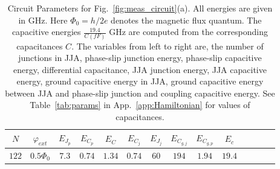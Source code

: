 \documentclass[prx,showpacs,notitlepage,twocolumn,superscriptaddress,nofootinbib,preprintnumbers,floatfix]{revtex4-2}
\begin{document}
\begin{table}[htb]
\centering
\begin{tabular}{|c|c|c|c|c|c|c|c|c|c|c|c|c|c|}
    \hline
     $N$&$\varphi_{ext}$ & $E_{J_p}$ & $E_{C_p}$&$E_C$&$E_{C_j}$& $E_{J_j}$& $E_{C_{g,j}}$&$E_{C_{g,p}}$&$E_c$\\
     \hline
$122$&$0.5\Phi_0$& $7.3$ & $0.74$ &$1.34$&$0.74$ & $60$ & $194$ &$1.94$ &$19.4$\\   \hline
\end{tabular}
\caption{Circuit Parameters for Fig.~\ref{fig:meas_circuit}(a). All energies are given in GHz. Here $\Phi_0=h/2e$ denotes the magnetic flux quantum. The capacitive energies $\frac{19.4}{C(fF)}$ GHz are computed from the corresponding capacitances $C$. The variables from left to right are, the number of junctions in JJA, phase-slip junction energy, phase-slip capacitive energy, differential capacitance, JJA junction energy, JJA capacitive energy, ground capacitive energy in JJA, ground capacitive energy between JJA and phase-slip junction and coupling capacitive energy. See Table~\ref{tab:params} in App.~\ref{app:Hamiltonian} for values of capacitances.}
\label{tab:circuit_params}
\end{table}
\end{document}
